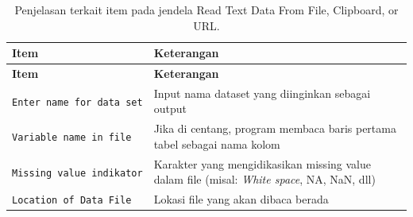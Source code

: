 \documentclass[12pt,]{krantz}
\begin{document}
\begin{longtable}[]{@{}ll@{}}
\caption{\label{tab:readpltext} Penjelasan terkait item pada jendela Read Text Data From File, Clipboard, or URL.}\tabularnewline
\toprule
\begin{minipage}[b]{0.21\columnwidth}\raggedright
\textbf{Item}\strut
\end{minipage} & \begin{minipage}[b]{0.73\columnwidth}\raggedright
\textbf{Keterangan}\strut
\end{minipage}\tabularnewline
\midrule
\endfirsthead
\toprule
\begin{minipage}[b]{0.21\columnwidth}\raggedright
\textbf{Item}\strut
\end{minipage} & \begin{minipage}[b]{0.73\columnwidth}\raggedright
\textbf{Keterangan}\strut
\end{minipage}\tabularnewline
\midrule
\endhead
\begin{minipage}[t]{0.21\columnwidth}\raggedright
\texttt{Enter\ name\ for\ data\ set}\strut
\end{minipage} & \begin{minipage}[t]{0.73\columnwidth}\raggedright
Input nama dataset yang diinginkan sebagai output\strut
\end{minipage}\tabularnewline
\begin{minipage}[t]{0.21\columnwidth}\raggedright
\texttt{Variable\ name\ in\ file}\strut
\end{minipage} & \begin{minipage}[t]{0.73\columnwidth}\raggedright
Jika di centang, program membaca baris pertama tabel sebagai nama kolom\strut
\end{minipage}\tabularnewline
\begin{minipage}[t]{0.21\columnwidth}\raggedright
\texttt{Missing\ value\ indikator}\strut
\end{minipage} & \begin{minipage}[t]{0.73\columnwidth}\raggedright
Karakter yang mengidikasikan missing value dalam file (misal: \emph{White space}, NA, NaN, dll)\strut
\end{minipage}\tabularnewline
\begin{minipage}[t]{0.21\columnwidth}\raggedright
\texttt{Location\ of\ Data\ File}\strut
\end{minipage} & \begin{minipage}[t]{0.73\columnwidth}\raggedright
Lokasi file yang akan dibaca berada\strut
\end{minipage}\tabularnewline

\end{longtable}
\end{document}
